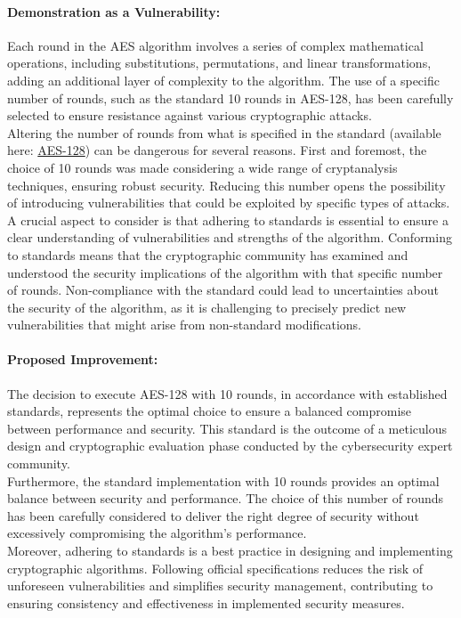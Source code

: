 \documentclass[12pt]{article}
\begin{document}
    \paragraph{Demonstration as a Vulnerability:}
    Each round in the AES algorithm involves a series of complex mathematical operations, including substitutions, permutations, and linear transformations, adding an additional layer of complexity to the algorithm. The use of a specific number of rounds, such as the standard 10 rounds in AES-128, has been carefully selected to ensure resistance against various cryptographic attacks.
    \\
    Altering the number of rounds from what is specified in the standard (available here: \href{https://csrc.nist.gov/files/pubs/fips/197/final/docs/fips-197.pdf}{AES-128}) can be dangerous for several reasons. First and foremost, the choice of 10 rounds was made considering a wide range of cryptanalysis techniques, ensuring robust security. Reducing this number opens the possibility of introducing vulnerabilities that could be exploited by specific types of attacks.
    \\
    A crucial aspect to consider is that adhering to standards is essential to ensure a clear understanding of vulnerabilities and strengths of the algorithm. Conforming to standards means that the cryptographic community has examined and understood the security implications of the algorithm with that specific number of rounds. Non-compliance with the standard could lead to uncertainties about the security of the algorithm, as it is challenging to precisely predict new vulnerabilities that might arise from non-standard modifications.
    
    \paragraph{Proposed Improvement:}
    The decision to execute AES-128 with 10 rounds, in accordance with established standards, represents the optimal choice to ensure a balanced compromise between performance and security. This standard is the outcome of a meticulous design and cryptographic evaluation phase conducted by the cybersecurity expert community.
    \\
    Furthermore, the standard implementation with 10 rounds provides an optimal balance between security and performance. The choice of this number of rounds has been carefully considered to deliver the right degree of security without excessively compromising the algorithm's performance.
    \\
    Moreover, adhering to standards is a best practice in designing and implementing cryptographic algorithms. Following official specifications reduces the risk of unforeseen vulnerabilities and simplifies security management, contributing to ensuring consistency and effectiveness in implemented security measures.
    
\end{document}
